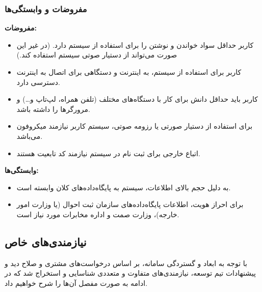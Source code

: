 \documentclass[12pt]{article}
\begin{document}
	\subsubsection{مفروضات و وابستگی‌ها}
	\textbf{مفروضات:}
	\begin{itemize}
		\item
		کاربر حداقل سواد خواندن و نوشتن را برای استفاده از سیستم دارد. (در غیر این صورت می‌تواند از دستیار صوتی سیستم استفاده کند.)
		\item
		کاربر برای استفاده از سیستم، به اینترنت و دستگاهی برای اتصال به اینترنت دسترسی دارد.
		\item
		کاربر باید حداقل دانش برای کار با دستگاه‌های مختلف (تلفن همراه، لپ‌تاپ و…) و مرورگرها را داشته باشد.
		\item
		برای استفاده از دستیار صورتی یا رزومه صوتی، سیستم کاربر نیازمند میکروفون می‌باشد.
		\item
		اتباع خارجی برای ثبت نام در سیستم نیازمند کد تابعیت هستند.
	\end{itemize}
	\textbf{وابستگی‌ها:}
	\begin{itemize}
		\item
		به دلیل حجم بالای اطلاعات، سیستم به پایگاه‌داده‌های کلان وابسته است.
		\item
		برای احراز هویت، اطلاعات پایگاه‌داده‌های سازمان ثبت احوال (یا وزارت امور خارجه)، وزارت صمت و اداره مخابرات مورد‌ نیاز است.
	\end{itemize}

	\newpage

	\subsection{نیازمندی‌های خاص}
	با توجه به ابعاد و گستردگی سامانه، بر اساس درخواست‌های مشتری و صلاح دید و پیشنهادات تیم توسعه، نیازمندی‌های متفاوت و متعددی شناسایی و استخراج شد که در ادامه به صورت مفصل آن‌ها را شرح خواهیم داد.
\end{document}
